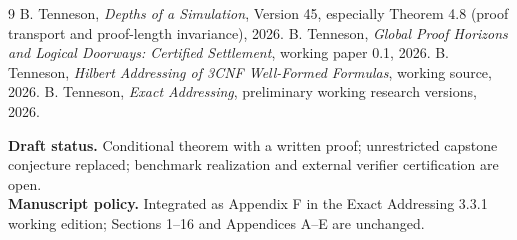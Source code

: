 \documentclass[11pt,letterpaper]{article}
\theoremstyle{definition}
\theoremstyle{remark}
\begin{document}
\begin{thebibliography}{9}
 B. Tenneson, \emph{Depths of a Simulation}, Version 45, especially Theorem 4.8 (proof transport and proof-length invariance), 2026.
 B. Tenneson, \emph{Global Proof Horizons and Logical Doorways: Certified Settlement}, working paper 0.1, 2026.
 B. Tenneson, \emph{Hilbert Addressing of 3CNF Well-Formed Formulas}, working source, 2026.
 B. Tenneson, \emph{Exact Addressing}, preliminary working research versions, 2026.
\end{thebibliography}

\noindent\textbf{Draft status.} Conditional theorem with a written proof; unrestricted capstone conjecture replaced; benchmark realization and external verifier certification are open.\\
\textbf{Manuscript policy.} Integrated as Appendix F in the Exact Addressing 3.3.1 working edition; Sections 1--16 and Appendices A--E are unchanged.
\end{document}
